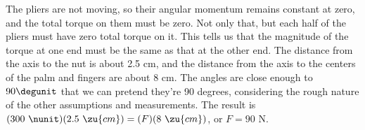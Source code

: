 The pliers are not moving, so their angular momentum
remains constant at zero, and the total torque on them must
be zero. Not only that, but each half of the pliers must
have zero total torque on it. This tells us that the
magnitude of the torque at one end must be the same as that
at the other end. The distance from the axis to the nut is
about 2.5 cm, and the distance from the axis to the centers
of the palm and fingers are about 8 cm. The angles are close
enough to $90\degunit$ that we can pretend they're 90 degrees,
considering the rough nature of the other assumptions and
measurements. The result is $(300\ \nunit)(2.5\ \zu{cm})=(F)(8\ \zu{cm})$,
 or $F=90$ N.



